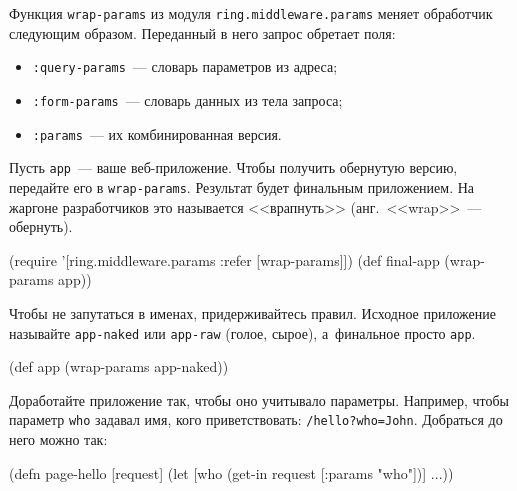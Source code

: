 
Функция \verb|wrap-params| из модуля \verb|ring.middleware.params| меняет
обработчик следующим образом. Переданный в него запрос обретает поля:

\begin{itemize}

\item
  \verb|:query-params|~--- словарь параметров из адреса;

\item
  \verb|:form-params|~--- словарь данных из тела запроса;

\item
  \verb|:params|~--- их комбинированная версия.

\end{itemize}

Пусть \verb|app|~--- ваше веб-приложение. Чтобы получить обернутую версию,
передайте его в \verb|wrap-params|. Результат будет финальным приложением. На
жаргоне разработчиков это называется <<врапнуть>> (анг.~<<wrap>>~--- обернуть).


\begin{english}
  \begin{clojure}
(require '[ring.middleware.params :refer [wrap-params]])
(def final-app (wrap-params app))
  \end{clojure}
\end{english}

Чтобы не запутаться в именах, придерживайтесь правил. Исходное приложение
называйте \verb|app-naked| или \verb|app-raw| (голое, сырое), а~финальное
просто \verb|app|.

\begin{english}
  \begin{clojure}
(def app (wrap-params app-naked))
  \end{clojure}
\end{english}

Доработайте приложение так, чтобы оно учитывало параметры. Например, чтобы
параметр \verb|who| задавал имя, кого приветствовать:
\verb|/hello?who=John|. Добраться до него можно так:

\begin{english}
  \begin{clojure}
(defn page-hello [request]
  (let [who (get-in request [:params "who"])]
    ...))
  \end{clojure}
\end{english}

